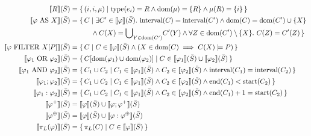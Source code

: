 \begin{figure}[t]
	\[
	\begin{aligned}
		\text{\textlbrackdbl} R \text{\textrbrackdbl}(\Stream) 
		&= \{\, (i, i, \mu)
		\mid \text{type}(e_i) = R 
		\land \text{dom}(\mu) = \{R\}
		\land \mu(R) = \{i\} \,\} \\
		\text{\textlbrackdbl} \varphi\ \text{AS}\ X \text{\textrbrackdbl}(\Stream) 
		&= \{\, C 
		\mid \exists C' \in \text{\textlbrackdbl} \varphi \text{\textrbrackdbl}(\Stream).\
		\text{interval}(C) = \text{interval}(C') 
		\land \text{dom}(C) = \text{dom}(C') \cup \{X\} \\& \hspace{30pt}	
		\land C(X) = {\bigcup}_{Y \in \text{dom}(C')} C'(Y)
		\land \forall Z \in \text{dom}(C') \setminus \{X\}.\ C(Z) = C'(Z) \,\} \\
		\text{\textlbrackdbl} \varphi\ \text{FILTER}\ X[P] \text{\textrbrackdbl}(\Stream) 
		&= \{\, C 
		\mid C \in \text{\textlbrackdbl} \varphi \text{\textrbrackdbl}(\Stream) 
		\land (X \in \text{dom}(C) \implies C(X) \models P) \,\} \\
		\text{\textlbrackdbl} \varphi_1\ \text{OR}\ \varphi_2 \text{\textrbrackdbl}(\Stream) 
		&= \{\, C[\text{dom}(\varphi_1) \cup \text{dom}(\varphi_2)]
		\mid C \in \text{\textlbrackdbl} \varphi_1 \text{\textrbrackdbl}(\Stream) 
		\cup 
		\text{\textlbrackdbl} \varphi_2 \text{\textrbrackdbl}(\Stream) \,\} \\
		\text{\textlbrackdbl} \varphi_1\ \text{AND}\ \varphi_2 \text{\textrbrackdbl}(\Stream) 
		&= \{\, C_1 \cup C_2 
		\mid C_1 \in \text{\textlbrackdbl} \varphi_1 \text{\textrbrackdbl}(\Stream) 
		\land C_2 \in \text{\textlbrackdbl} \varphi_2 \text{\textrbrackdbl}(\Stream)
		\land \text{interval}(C_1) = \text{interval}(C_2) \,\} \\
		\text{\textlbrackdbl} \varphi_1 ; \varphi_2 \text{\textrbrackdbl}(\Stream) 
		&= \{\, C_1 \cup C_2 
		\mid C_1 \in \text{\textlbrackdbl} \varphi_1 \text{\textrbrackdbl}(\Stream) 
		\land C_2 \in \text{\textlbrackdbl} \varphi_2 \text{\textrbrackdbl}(\Stream)
		\land \text{end}(C_1) < \text{start}(C_2) \,\} \\
		\text{\textlbrackdbl} \varphi_1 : \varphi_2 \text{\textrbrackdbl}(\Stream) 
		&= \{\, C_1 \cup C_2 
		\mid C_1 \in \text{\textlbrackdbl} \varphi_1 \text{\textrbrackdbl}(\Stream) 
		\land C_2 \in \text{\textlbrackdbl} \varphi_2 \text{\textrbrackdbl}(\Stream)
		\land \text{end}(C_1) + 1 = \text{start}(C_2) \,\} \\
		\text{\textlbrackdbl} \varphi^{+} \text{\textrbrackdbl}(\Stream) 
		&= \text{\textlbrackdbl} \varphi \text{\textrbrackdbl}(\Stream) 
		\cup 
		\text{\textlbrackdbl} \varphi ; \varphi^{+} \text{\textrbrackdbl}(\Stream) \\
		\text{\textlbrackdbl} \varphi^{\oplus} \text{\textrbrackdbl}(\Stream) 
		&= \text{\textlbrackdbl} \varphi \text{\textrbrackdbl}(\Stream) 
		\cup 
		\text{\textlbrackdbl} \varphi : \varphi^{\oplus} \text{\textrbrackdbl}(\Stream) \\
		\text{\textlbrackdbl} \pi_{L}(\varphi) \text{\textrbrackdbl}(\Stream) 
		&= \{\, \pi_L(C) 
		\mid C \in \text{\textlbrackdbl} \varphi \text{\textrbrackdbl}(\Stream) \,\}
	\end{aligned}
	\]
	

\end{figure}
